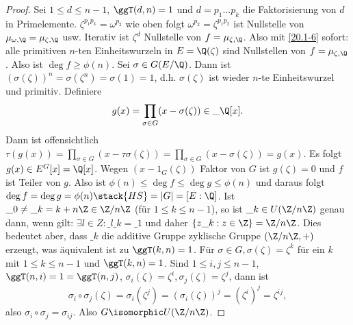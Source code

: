 \begin{st}
\begin{proof}
		Sei $1 \le d \le n-1$, $\ggT(d,n) = 1$ und $d = p_1 \dotsc p_k$ die Faktorisierung von $d$ in Primelemente.
		$\zeta^{p_1p_k} = \omega^{p_2}$ wie oben folgt $\omega^{p_2} = \zeta^{p_1 p_2}$ ist Nullstelle von $\mu_{\omega, \Q} = \mu_{\zeta, \Q}$ usw.
		Iterativ ist $\zeta^d$ Nullstelle von $f = \mu_{\zeta, \Q}$.
		Also mit \ref{20.1-6} sofort:
		alle primitiven $n$-ten Einheitswurzeln in $E = \Q(\zeta)$ sind Nullstellen von $f = \mu_{\zeta, \Q}$.
		Also ist $\deg f \ge \phi(n)$.
		Sei $\sigma \in G(E / \Q)$.
		Dann ist $(\sigma(\zeta))^n = \sigma(\zeta^n) = \sigma(1) = 1$, d.h. $\sigma(\zeta)$ ist wieder $n$-te Einheitswurzel und primitiv.
		Definiere
		\[
			g(x) = \prod_{\sigma \in G} (x - \sigma(\zeta)) \in \_\Q[x].
		\]
		Dann ist offensichtlich $\tau(g(x)) = \prod_{\sigma \in G} (x - \tau\sigma(\zeta)) = \prod_{\sigma \in G} (x - \sigma(\zeta)) = g(x)$.
		Es folgt $g(x) \in E^G[x] = \Q[x]$.
		Wegen $(x - 1_G(\zeta))$ Faktor von $G$ ist $g(\zeta) = 0$ und $f$ ist Teiler von $g$.
		Also ist $\phi(n) \le \deg f \le \deg g \le \phi(n)$ und daraus folgt $\deg f = \deg g = \phi(n) \stack{HS}= |G| = [E: \Q]$.
		Ist $\_0 \neq \_k = k + n \Z \in \Z / n \Z$ (für $1 \le k \le n-1$), so ist $\_k \in U(\Z / n\Z)$ genau dann, wenn gilt: $\exists l \in Z : \_l\_k = \_1$ und daher $\{z\_k : z \in \Z\} = \Z / n \Z$.
		Dies bedeutet aber, dass $\_k$ die additive Gruppe zyklische Gruppe $(\Z / n \Z, +)$ erzeugt, was äquivalent ist zu $\ggT(k,n) = 1$. 
		Für $\sigma \in G, \sigma(\zeta) = \zeta^k$ für ein $k$ mit $1 \le k \le n-1$ und $\ggT(k, n) = 1$.
		Sind $1 \le i,j \le n-1$, $\ggT(n,i) = 1 = \ggT(n,j)$, $\sigma_i(\zeta) = \zeta^i, \sigma_j(\zeta) = \zeta^j$, dann ist
		\[
			\sigma_i \circ \sigma_j (\zeta) = \sigma_i(\zeta^j) = (\sigma_i(\zeta))^j = (\zeta^i)^j = \zeta^{ij},
		\]
		also $\sigma_i \circ \sigma_j = \sigma_{ij}$.
		Also $G \isomorphic U(\Z / n\Z)$.
	\end{proof}
\end{st}

